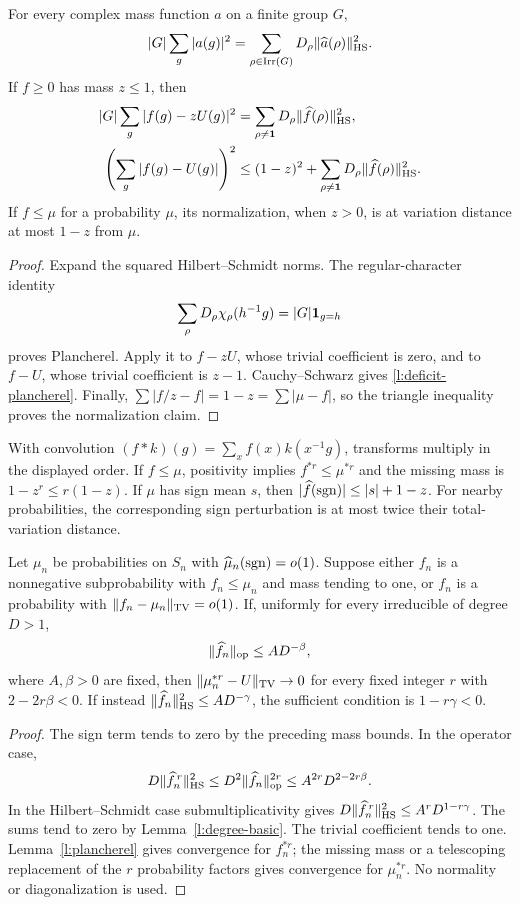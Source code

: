 \begin{lemma}\label{l:plancherel}
For every complex mass function $a$ on a finite group $G$,
\[
 |G|\sum_g|a(g)|^2=\sum_{\rho\in\operatorname{Irr}(G)}D_\rho\|\widehat a(\rho)\|_{\mathrm{HS}}^2.
\]
If $f\ge0$ has mass $z\le1$, then
\begin{align}
 |G|\sum_g|f(g)-zU(g)|^2&=\sum_{\rho\ne\mathbf1}D_\rho\|\widehat f(\rho)\|_{\mathrm{HS}}^2,\label{l:centered-plancherel}\\
 \left(\sum_g|f(g)-U(g)|\right)^2&\le(1-z)^2+\sum_{\rho\ne\mathbf1}D_\rho\|\widehat f(\rho)\|_{\mathrm{HS}}^2.\label{l:deficit-plancherel}
\end{align}
If $f\le\mu$ for a probability $\mu$, its normalization, when $z>0$, is at variation distance at most $1-z$ from $\mu$.
\end{lemma}
\begin{proof}
Expand the squared Hilbert--Schmidt norms. The regular-character identity
\[\sum_\rho D_\rho\chi_\rho(h^{-1}g)=|G|\mathbf1_{g=h}\]
proves Plancherel. Apply it to $f-zU$, whose trivial coefficient is zero, and to $f-U$, whose trivial coefficient is $z-1$. Cauchy--Schwarz gives \eqref{l:deficit-plancherel}. Finally, $\sum|f/z-f|=1-z=\sum|\mu-f|$, so the triangle inequality proves the normalization claim.
\end{proof}

With convolution $(f*k)(g)=\sum_xf(x)k(x^{-1}g)$, transforms multiply in the displayed order. If $f\le\mu$, positivity implies $f^{*r}\le\mu^{*r}$ and the missing mass is $1-z^r\le r(1-z)$. If $\mu$ has sign mean $s$, then $|\widehat f(\operatorname{sgn})|\le |s|+1-z$. For nearby probabilities, the corresponding sign perturbation is at most twice their total-variation distance.

\begin{proposition}\label{l:amplification}
Let $\mu_n$ be probabilities on $S_n$ with $\widehat\mu_n(\operatorname{sgn})=o(1)$. Suppose either $f_n$ is a nonnegative subprobability with $f_n\le\mu_n$ and mass tending to one, or $f_n$ is a probability with $\|f_n-\mu_n\|_{\mathrm{TV}}=o(1)$. If, uniformly for every irreducible of degree $D>1$,
\[
 \|\widehat f_n\|_{\mathrm{op}}\le A D^{-\beta},
\]
where $A,\beta>0$ are fixed, then $\|\mu_n^{*r}-U\|_{\mathrm{TV}}\to0$ for every fixed integer $r$ with $2-2r\beta<0$.
If instead $\|\widehat f_n\|_{\mathrm{HS}}^2\le A D^{-\gamma}$, the sufficient condition is $1-r\gamma<0$.
\end{proposition}
\begin{proof}
The sign term tends to zero by the preceding mass bounds. In the operator case,
\[
 D\|\widehat f_n^{\,r}\|_{\mathrm{HS}}^2\le D^2\|\widehat f_n\|_{\mathrm{op}}^{2r}\le A^{2r}D^{2-2r\beta}.
\]
In the Hilbert--Schmidt case submultiplicativity gives $D\|\widehat f_n^{\,r}\|_{\mathrm{HS}}^2\le A^rD^{1-r\gamma}$. The sums tend to zero by Lemma~\ref{l:degree-basic}. The trivial coefficient tends to one. Lemma~\ref{l:plancherel} gives convergence for $f_n^{*r}$; the missing mass or a telescoping replacement of the $r$ probability factors gives convergence for $\mu_n^{*r}$. No normality or diagonalization is used.
\end{proof}
